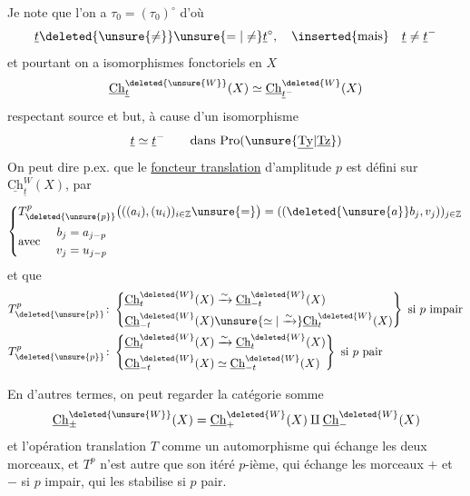 Je note  que l'on a $\tau_0=(\tau_0)^{\circ}$ d'où
\[
\underline t\deleted{\unsure{\ne}}\unsure{=|\ne}\underline t^{\circ},\quad\inserted{\text{mais}}\quad\underline t\ne\underline t^{-}
\]
et pourtant on a  isomorphismes fonctoriels
en $X$
\[
\underline{\mathrm{Ch}}^{\deleted{\unsure{W}}}_{\underline t}(X)\simeq
\underline{\mathrm{Ch}}^{\deleted{W}}_{\underline t^{-}}(X)
\]
respectant source et but, à cause d'un isomorphisme
\[
\underline t\simeq\underline t^{-}\qquad\text{dans }\mathrm{Pro}(\unsure{\underline{\mathrm{Ty}}|\underline{\mathrm{Tz}}})
\]
On peut dire p.ex. que le \uline{foncteur translation} 
d'amplitude $p$  est défini sur $\underline{\mathrm{Ch}}^{W}_{\underline t}(X)$, par
\[
\left\{\begin{aligned}
&T^{p}_{\deleted{\unsure{p}}}\bigl(((a_i),(u_i))_{i\in\mathbb Z}\unsure{=}\bigr)=((\deleted{\unsure{a}}b_j,v_j))_{j\in\mathbb Z}\\
&\text{avec }\quad\begin{aligned}b_j&=a_{j-p}\\v_j&=u_{j-p}\end{aligned}
\end{aligned}\right.
\]
et que
\[
\begin{aligned}
T^{p}_{\deleted{\unsure{p}}}\colon&
\left\{\begin{aligned}
\underline{\mathrm{Ch}}^{\deleted{W}}_{t}(X)&\xrightarrow{\sim}\underline{\mathrm{Ch}}^{\deleted{W}}_{-t}(X)\\
\underline{\mathrm{Ch}}^{\deleted{W}}_{-t}(X)&\unsure{\simeq|\xrightarrow{\sim}}\underline{\mathrm{Ch}}^{\deleted{W}}_{t}(X)
\end{aligned}\right\}\ \text{si }p\text{ impair}\\
T^{p}_{\deleted{\unsure{p}}}\colon&
\left\{\begin{aligned}
\underline{\mathrm{Ch}}^{\deleted{W}}_{t}(X)&\xrightarrow{\sim}\underline{\mathrm{Ch}}^{\deleted{W}}_{t}(X)\\
\underline{\mathrm{Ch}}^{\deleted{W}}_{-t}(X)&\simeq\underline{\mathrm{Ch}}^{\deleted{W}}_{-t}(X)
\end{aligned}\right\}\ \text{si }p\text{ pair}
\end{aligned}
\]

En d'autres termes, on peut  regarder
la catégorie somme
\[
\underline{\mathrm{Ch}}_{\pm}^{\deleted{\unsure{W}}}(X)=
\underline{\mathrm{Ch}}_+^{\deleted{W}}(X)\amalg\underline{\mathrm{Ch}}_-^{\deleted{W}}(X)
\]
et l'opération translation $T$ comme un
automorphisme qui échange les deux
morceaux, et $T^p$ n'est autre que son
itéré $p$-ième, qui échange les morceaux $+$ et $-$
si $p$ impair, qui les stabilise si $p$ pair.

